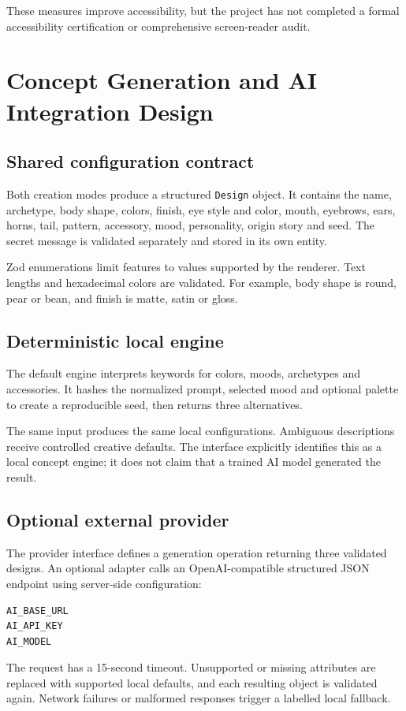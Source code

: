 \documentclass[11pt,a4paper]{article}
\begin{document}
These measures improve accessibility, but the project has not completed a formal accessibility certification or comprehensive screen-reader audit.

\section{Concept Generation and AI Integration Design}

\subsection{Shared configuration contract}
Both creation modes produce a structured \texttt{Design} object. It contains the name, archetype, body shape, colors, finish, eye style and color, mouth, eyebrows, ears, horns, tail, pattern, accessory, mood, personality, origin story and seed. The secret message is validated separately and stored in its own entity.

Zod enumerations limit features to values supported by the renderer. Text lengths and hexadecimal colors are validated. For example, body shape is round, pear or bean, and finish is matte, satin or gloss.

\subsection{Deterministic local engine}
The default engine interprets keywords for colors, moods, archetypes and accessories. It hashes the normalized prompt, selected mood and optional palette to create a reproducible seed, then returns three alternatives.

The same input produces the same local configurations. Ambiguous descriptions receive controlled creative defaults. The interface explicitly identifies this as a local concept engine; it does not claim that a trained AI model generated the result.

\subsection{Optional external provider}
The provider interface defines a generation operation returning three validated designs. An optional adapter calls an OpenAI-compatible structured JSON endpoint using server-side configuration:
\begin{lstlisting}
AI_BASE_URL
AI_API_KEY
AI_MODEL
\end{lstlisting}

The request has a 15-second timeout. Unsupported or missing attributes are replaced with supported local defaults, and each resulting object is validated again. Network failures or malformed responses trigger a labelled local fallback.
\end{document}
